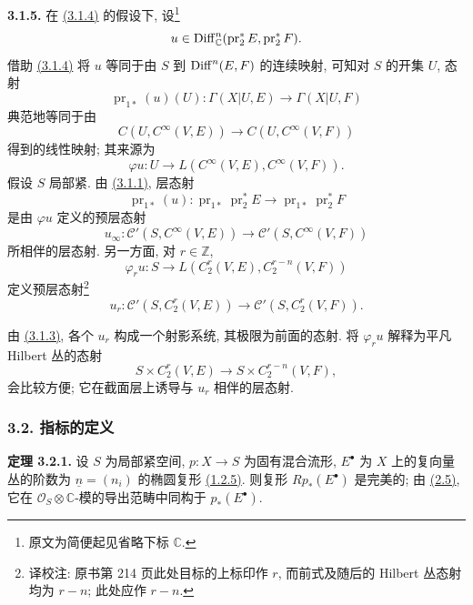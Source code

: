 \textbf{3.1.5.} 在 \hyperlink{sga6.e02.lem.3-1-4}{(3.1.4)} 的假设下, 设\footnote{原文为简便起见省略下标 $\mathbb C$.}
\[
 u\in\operatorname{Diff}^n_{\mathbb C}(\operatorname{pr}_2^*E,\operatorname{pr}_2^*F).
\]
借助 \hyperlink{sga6.e02.lem.3-1-4}{(3.1.4)} 将 $u$ 等同于由 $S$ 到 $\operatorname{Diff}^n(E,F)$ 的连续映射, 可知对 $S$ 的开集 $U$, 态射
\[
 \operatorname{pr}_{1*}(u)(U):\Gamma(X|U,E)\longrightarrow\Gamma(X|U,F)
\]
典范地等同于由
\[
 C(U,C^\infty(V,E))\longrightarrow C(U,C^\infty(V,F))
\]
得到的线性映射; 其来源为
\[
 \varphi u:U\longrightarrow L(C^\infty(V,E),C^\infty(V,F)).
\]
假设 $S$ 局部紧. 由 \hyperlink{sga6.e02.lem.3-1-1}{(3.1.1)}, 层态射
\[
 \operatorname{pr}_{1*}(u):
 \operatorname{pr}_{1*}\operatorname{pr}_2^*E
 \longrightarrow
 \operatorname{pr}_{1*}\operatorname{pr}_2^*F
\]
是由 $\varphi u$ 定义的预层态射
\[
 u_\infty:\mathcal C'(S,C^\infty(V,E))\longrightarrow \mathcal C'(S,C^\infty(V,F))
\]
所相伴的层态射. 另一方面, 对 $r\in\mathbb Z$,
\[
 \varphi_r u:S\longrightarrow L(C_2^{r}(V,E),C_2^{r-n}(V,F))
\]
定义预层态射\footnote{译校注: 原书第 214 页此处目标的上标印作 \(r\), 而前式及随后的 Hilbert 丛态射均为 \(r-n\); 此处应作 \(r-n\).}
\[
 u_r:\mathcal C'(S,C_2^{r}(V,E))\longrightarrow \mathcal C'(S,C_2^{r}(V,F)).
\]

由 \hyperlink{sga6.e02.para.3-1-3}{(3.1.3)}, 各个 $u_r$ 构成一个射影系统, 其极限为前面的态射. 将 $\varphi_r u$ 解释为平凡 Hilbert 丛的态射
\[
 S\times C_2^{r}(V,E)\longrightarrow S\times C_2^{r-n}(V,F),
\]
会比较方便; 它在截面层上诱导与 $u_r$ 相伴的层态射.

\subsubsection*{3.2. 指标的定义}

\textbf{定理 3.2.1.} 设 $S$ 为局部紧空间, $p:X\to S$ 为固有混合流形, $E^\bullet$ 为 $X$ 上的复向量丛的阶数为 $\underline n=(n_i)$ 的椭圆复形 \hyperlink{sga6.e02.para.1-2-5}{(1.2.5)}. 则复形 $Rp_*(E^\bullet)$ 是完美的; 由 \hyperlink{sga6.e02.cor.2-5}{(2.5)}, 它在 $\mathcal O_S\otimes\mathbb C$-模的导出范畴中同构于 $p_*(E^\bullet)$.


